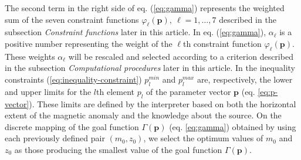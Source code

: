 The second term in the right side of eq. (\ref{eq:gamma}) represents the weighted sum of
the seven constraint functions $\varphi_{\ell}(\mathbf{p}), \: \ell = 1, \dots, 7$ 
described in the subsection \textit{Constraint functions} later in this article.
In eq. (\ref{eq:gamma}), $\alpha_{\ell}$ is a positive number representing 
the weight of the $\ell$th constraint function $\varphi_{\ell}(\mathbf{p})$.
These weights $\alpha_{\ell}$ will be rescaled and selected according to a criterion described in the subsection \textit{Computational procedures} later in this article.
In the inequality constraints (\ref{eq:inequality-constraint}) 
$p_{l}^{min}$ and $p_{l}^{max}$ are, respectively, the lower and upper limits for the $l$th element $p_{l}$ of the parameter vector $\mathbf{p}$ (eq. \ref{eq:p-vector}). 
These limits are defined by the interpreter 
based on both the horizontal extent of the magnetic anomaly and the knowledge about the 
source.
On the discrete mapping of the goal function $\Gamma (\mathbf{p})$ 
(eq. \ref{eq:gamma}) obtained by using each previously defined pair $(m_{0}, z_{0})$, 
we select the optimum values of $m_{0}$ and $z_{0}$ 
as those producing the smallest value of the goal function $\Gamma (\mathbf{p})$.

